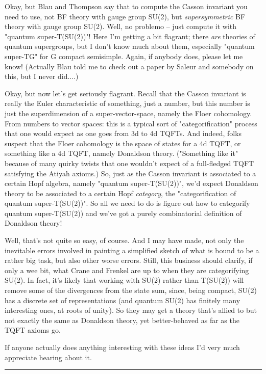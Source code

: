 Okay, but Blau and Thompson say that to compute the Casson
invariant you need to use, not BF theory with gauge group SU(2),
but \emph{supersymmetric} BF theory with gauge group SU(2).  Well,
no problemo -- just compute it with "quantum super-T(SU(2))"!  
Here I'm
getting a bit flagrant; there \emph{are} theories of quantum supergroups, 
but I don't know much about them, especially "quantum super-TG"
for G compact semisimple.  Again, if anybody does, please let me know!
(Actually Blau told me to check out a paper by Saleur and somebody
on this, but I never did....)

Okay, but now let's get seriously flagrant.  Recall that the Casson invariant
is really the Euler characteristic of something, just a number, but this
number is just the superdimension of a super-vector-space, namely
the Floer cohomology.  From numbers to vector spaces: this is a typical
sort of "categorification" process that one would expect as one goes
from 3d to 4d TQFTs.  And indeed, folks suspect that the Floer cohomology
is the space of states for a 4d TQFT, or something like a 4d TQFT,
namely Donaldson theory.  ("Something like it" because of many quirky
twists that one wouldn't expect of a full-fledged TQFT satisfying the
Atiyah axioms.)  So, just as the Casson invariant is associated to a certain
Hopf algebra, namely "quantum super-T(SU(2))", we'd expect Donaldson
theory to be associated to a certain Hopf \emph{category}, 
the "categorification
of quantum super-T(SU(2))".  So all we need to do is figure out how
to categorify quantum super-T(SU(2)) and we've got a purely combinatorial
definition of Donaldson theory!

Well, that's not quite so easy, of course.  And I may have made, not
only the inevitable errors involved in painting a simplified sketch of what is
bound to be a rather big task, but also other worse errors.  Still, 
this business should clarify, if only a wee bit, what Crane and Frenkel are up 
to when they are categorifying SU(2).  In fact, it's likely that working with 
SU(2) rather than T(SU(2)) will remove some of the divergences from the state 
sum, since, being compact, SU(2) has a discrete set of representations (and
quantum SU(2) has finitely many interesting ones, at roots of unity).  So
they may get a theory that's allied to but not exactly the same as Donaldson 
theory, yet better-behaved as far as the TQFT axioms go.  

If anyone actually does anything interesting with these ideas I'd
very much appreciate hearing about it.

\par\noindent\rule{\textwidth}{0.4pt}


